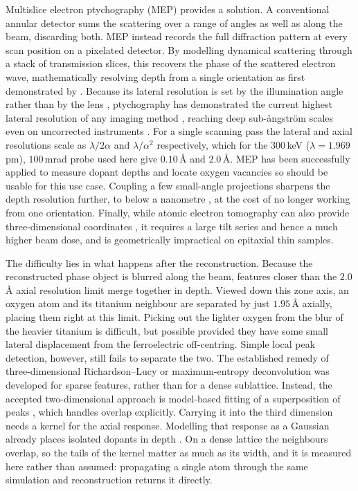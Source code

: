 \documentclass[aps,prb,twocolumn,superscriptaddress,floatfix,nofootinbib]{revtex4-2}
\begin{document}
Multislice electron ptychography (MEP) provides a solution. A conventional annular detector sums the scattering over a range of angles as well as along the beam, discarding both. MEP instead records the full diffraction pattern at every scan position on a pixelated detector. By modelling dynamical scattering through a stack of transmission slices, this recovers the phase of the scattered electron wave, mathematically resolving depth from a single orientation as first demonstrated by \citet{Gao2017}. Because its lateral resolution is set by the illumination angle rather than by the lens \citep{Nellist1995}, ptychography has demonstrated the current highest lateral resolution of any imaging method \citep{Chen2021}, reaching deep sub-\aa{}ngstr\"om scales even on uncorrected instruments \citep{Nguyen2024}. For a single scanning pass the lateral and axial resolutions scale as $\lambda/2\alpha$ and $\lambda/\alpha^2$ respectively, which for the $300$\,keV ($\lambda=1.969$\,pm), $100$\,mrad probe used here give $0.10$\,\AA{} and $2.0$\,\AA. MEP has been successfully applied to measure dopant depths \citep{Chen2021} and locate oxygen vacancies \citep{Dong2024} so should be usable for this use case. Coupling a few small-angle projections sharpens the depth resolution further, to below a nanometre \citep{Dong2025}, at the cost of no longer working from one orientation. Finally, while atomic electron tomography can also provide three-dimensional coordinates \citep{Yang2017}, it requires a large tilt series and hence a much higher beam dose, and is geometrically impractical on epitaxial thin samples.

The difficulty lies in what happens after the reconstruction. Because the reconstructed phase object is blurred along the beam, features closer than the $2.0$\,\AA{} axial resolution limit merge together in depth. Viewed down this zone axis, an oxygen atom and its titanium neighbour are separated by just $1.95$\,\AA{} axially, placing them right at this limit. Picking out the lighter oxygen from the blur of the heavier titanium is difficult, but possible provided they have some small lateral displacement from the ferroelectric off-centring. Simple local peak detection, however, still fails to separate the two. The established remedy of three-dimensional Richardson--Lucy or maximum-entropy deconvolution \citep{Ishizuka2021} was developed for sparse features, rather than for a dense sublattice. Instead, the accepted two-dimensional approach is model-based fitting of a superposition of peaks \citep{DeBacker2016}, which handles overlap explicitly. Carrying it into the third dimension needs a kernel for the axial response. Modelling that response as a Gaussian already places isolated dopants in depth \citep{Chen2021}. On a dense lattice the neighbours overlap, so the tails of the kernel matter as much as its width, and it is measured here rather than assumed: propagating a single atom through the same simulation and reconstruction returns it directly.
\end{document}
